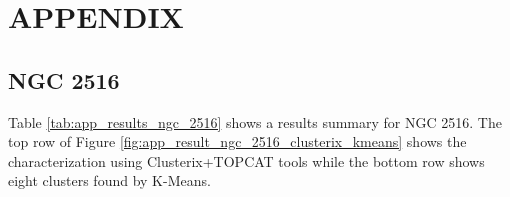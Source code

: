 \documentclass[11pt,a4paper,english,twocolumn]{article}
\begin{document}
\appendix
\section{APPENDIX}
\label{sec:appendix}

\subsection{NGC 2516}
\label{sec:ngc2516}

\begin{table}[htbp]
  \begin{center}
    \caption{NGC 2516 results.}
    \label{tab:app_results_ngc_2516}
  \end{center}
\end{table}

Table \ref{tab:app_results_ngc_2516} shows a results summary for NGC 2516.
The top row of Figure \ref{fig:app_result_ngc_2516_clusterix_kmeans} shows
the characterization using Clusterix+TOPCAT tools while the bottom row
shows eight clusters found by K-Means.
\end{document}
